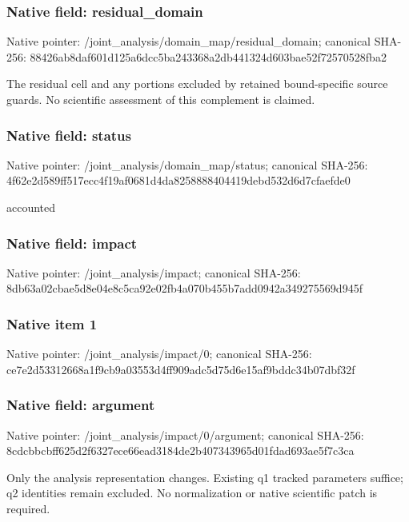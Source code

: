 \documentclass[10pt,a4paper]{article}
\begin{document}
\subsubsection{Native field: residual\_\allowbreak{}domain}
Native pointer: /joint\_\allowbreak{}analysis/domain\_\allowbreak{}map/residual\_\allowbreak{}domain; canonical SHA-256: 88426ab8daf601d125a6dcc5ba243368a2db441324d603bae52f72570528fba2

\begingroup\raggedright\sloppy The residual cell and any portions excluded by retained bound-specific source guards. No scientific assessment of this complement is claimed.\par\endgroup

\subsubsection{Native field: status}
Native pointer: /joint\_\allowbreak{}analysis/domain\_\allowbreak{}map/status; canonical SHA-256: 4f62e2d589ff517ecc4f19af0681d4da8258888404419debd532d6d7cfaefde0

\begingroup\raggedright\sloppy accounted\par\endgroup

\subsubsection{Native field: impact}
Native pointer: /joint\_\allowbreak{}analysis/impact; canonical SHA-256: 8db63a02cbae5d8e04e8c5ca92e02fb4a070b455b7add0942a349275569d945f

\subsubsection{Native item 1}
Native pointer: /joint\_\allowbreak{}analysis/impact/0; canonical SHA-256: ce7e2d53312668a1f9cb9a03553d4ff909adc5d75d6e15af9bddc34b07dbf32f

\subsubsection{Native field: argument}
Native pointer: /joint\_\allowbreak{}analysis/impact/0/argument; canonical SHA-256: 8cdcbbcbff625d2f6327ece66ead3184de2b407343965d01fdad693ae5f7c3ca

\begingroup\raggedright\sloppy Only the analysis representation changes. Existing q1 tracked parameters suffice;\allowbreak{} q2 identities remain excluded. No normalization or native scientific patch is required.\par\endgroup
\end{document}

